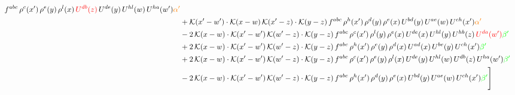 \documentclass[9pt]{article}
\numberwithin{equation}{section}
\begin{document}
\begin{align}
f^{abc}\,\rho^{c}(x')\,\rho^{e}(y)\,\rho^{l}(x)\,{\color{red}U^{db}(z)}\,U^{de}(y)\,U^{hl}(w)\,U^{ha}(w'){\color{orange} \alpha'}\notag \\ &+\mathcal{K}(x'-w')\cdot\mathcal{K}(x-w)\,\mathcal{K}(x'-z)\cdot\mathcal{K}(y-z)\, f^{abc}\,\rho^{h}(x')\,\rho^{d}(y)\,\rho^{e}(x)\,U^{bd}(y)\,U^{ae}(w)\,U^{ch}(x'){\color{orange} \alpha'}\notag \\ &-2\,\mathcal{K}(x-w)\cdot\mathcal{K}(x'-w')\,\mathcal{K}(w'-z)\cdot\mathcal{K}(y-z)\, f^{abc}\,\rho^{c}(x')\,\rho^{l}(y)\,\rho^{e}(x)\,U^{de}(x)\,U^{hl}(y)\,U^{hb}(z)\,{\color{red}U^{da}(w')}{\color{green} \beta'}\notag\\ & +2\,\mathcal{K}(x-w)\cdot\mathcal{K}(x'-w')\,\mathcal{K}(w'-z)\cdot\mathcal{K}(y-z)\, f^{abc}\,\rho^{h}(x')\,\rho^{e}(y)\,\rho^{d}(x)\,U^{ad}(x)\,U^{be}(y)\,U^{ch}(x'){\color{green} \beta'}\notag\\ & +2\,\mathcal{K}(x-w)\cdot\mathcal{K}(x'-w')\,\mathcal{K}(w'-z)\cdot\mathcal{K}(y-z)\, f^{abc}\,\rho^{c}(x')\,\rho^{e}(y)\,\rho^{l}(x)\,U^{de}(y)\,U^{hl}(w)\,U^{db}(z)\,U^{ha}(w'){\color{green} \beta'}\notag\\ &-2\,\mathcal{K}(x-w)\cdot\mathcal{K}(x'-w')\,\mathcal{K}(w'-z)\cdot\mathcal{K}(y-z)\, f^{abc}\,\rho^{h}(x')\,\rho^{d}(y)\,\rho^{e}(x)\,U^{bd}(y)\,U^{ae}(w)\,U^{ch}(x'){\color{green} \beta'}\Bigg] 
\end{align}     
\end{document}
